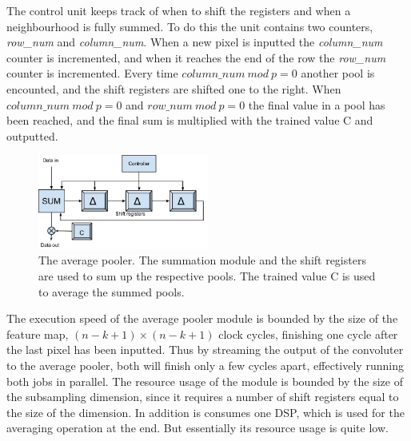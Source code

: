 The control unit keeps track of when to shift the registers and when a neighbourhood is fully summed. To do this the unit contains two counters, \textit{row\_num} and \textit{column\_num}. When a new pixel is inputted the \textit{column\_num} counter is incremented, and when it reaches the end of the row the \textit{row\_num} counter is incremented. Every time $ column\_num~mod~p = 0 $ another pool is encounted, and the shift registers are shifted one to the right. When $ column\_num~mod~p = 0 $ and $ row\_num~mod~p = 0 $ the final value in a pool has been reached, and the final sum is multiplied with the trained value C and outputted. 

\begin{figure}[h!]
  \centering
      \includegraphics[width=0.5\textwidth]{Figures/Method/submax}
  \caption[The Average Pooler]{The average pooler. The summation module and the shift registers are used to sum up the respective pools. The trained value C is used to average the summed pools.}
  \label{fig_average_pooler}
\end{figure}

The execution speed of the average pooler module is bounded by the size of the feature map, $ (n-k+1) \times (n-k+1) $ clock cycles, finishing one cycle after the last pixel has been inputted. Thus by streaming the output of the convoluter to the average pooler, both will finish only a few cycles apart, effectively running both jobs in parallel. The resource usage of the module is bounded by the size of the subsampling dimension, since it requires a number of shift registers equal to the size of the dimension. In addition is consumes one DSP, which is used for the averaging operation at the end. But essentially its resource usage is quite low.  

